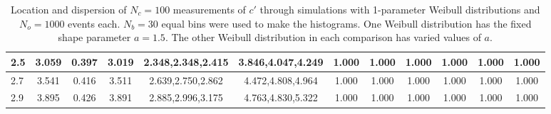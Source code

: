 \begin{table*}[h!]
\begin{center}
\begin{tabular}{| l | c | c | c | c | c | c | c | c | c | c | c |}
2.5 & 3.059 & 0.397 & 3.019 & 2.348,2.348,2.415 & 3.846,4.047,4.249  & 1.000  & 1.000  & 1.000  & 1.000  & 1.000  & 1.000 \\\hline
2.7 & 3.541 & 0.416 & 3.511 & 2.639,2.750,2.862 & 4.472,4.808,4.964  & 1.000  & 1.000  & 1.000  & 1.000  & 1.000  & 1.000 \\\hline
2.9 & 3.895 & 0.426 & 3.891 & 2.885,2.996,3.175 & 4.763,4.830,5.322  & 1.000  & 1.000  & 1.000  & 1.000  & 1.000  & 1.000 \\\hline
\end{tabular}
\caption{Location and dispersion of $N_c=100$
measurements of $c'$ through simulations
with 1-parameter Weibull distributions and $N_o=1000$ events each.
$N_b=30$ equal bins were used to make the histograms.
One Weibull distribution has the fixed shape parameter $a=1.5$.
The other Weibull distribution in each comparison
has varied values of $a$.}
\end{center}
\end{table*}